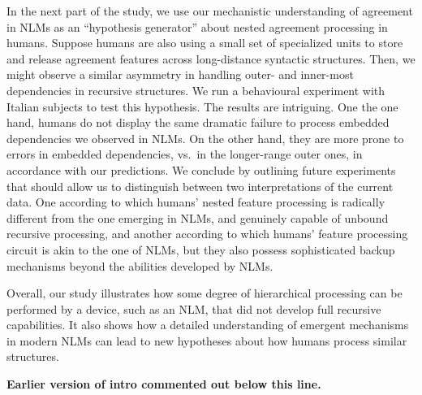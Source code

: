 In the next part of the study, we use our mechanistic understanding of
agreement in NLMs as an ``hypothesis generator''
\citep{Cichy:Kaiser:2019} about nested agreement processing in
humans. Suppose humans are also using a small set of specialized units
to store and release agreement features across long-distance syntactic
structures. Then, we might observe a similar asymmetry in handling
outer- and inner-most dependencies in recursive structures. We run a
behavioural experiment with Italian subjects to test this
hypothesis. The results are intriguing. One the one hand, humans do
not display the same dramatic failure to process embedded dependencies
we observed in NLMs. On the other hand, they are more prone to errors
in embedded dependencies, vs.~in the longer-range outer ones, in
accordance with our predictions. We conclude by outlining future
experiments that should allow us to distinguish between two
interpretations of the current data. One according to which humans'
nested feature processing is radically different from the one emerging
in NLMs, and genuinely capable of unbound recursive processing, and
another according to which humans' feature processing circuit is akin
to the one of NLMs, but they also possess sophisticated backup
mechanisms beyond the abilities developed by NLMs.

Overall, our study illustrates how some degree of hierarchical
processing can be performed by a device, such as an NLM, that did not
develop full recursive capabilities. It also shows how a detailed
understanding of emergent mechanisms in modern NLMs can lead to new
hypotheses about how humans process similar structures.

\textbf{Earlier version of intro commented out below this line.}


